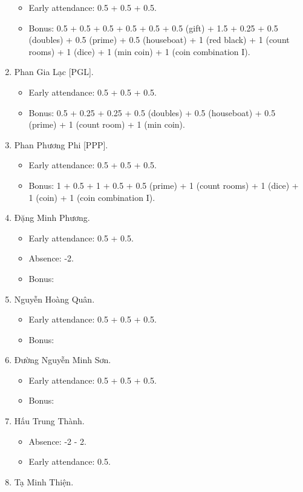 \documentclass{article}
\begin{document}
\begin{enumerate}
\begin{itemize}
		\item Early attendance: 0.5 + 0.5 + 0.5.
		\item Bonus: 0.5 + 0.5 + 0.5 + 0.5 + 0.5 + 0.5 (gift) + 1.5 + 0.25 + 0.5 (doubles) + 0.5 (prime) + 0.5 (houseboat) + 1 (red black) + 1 (count rooms) + 1 (dice) + 1 (min coin) + 1 (coin combination I).
	\end{itemize}
	\item {\sc Phan Gia Lạc [PGL].}
	\begin{itemize}
		\item Early attendance: 0.5 + 0.5 + 0.5.
		\item Bonus: 0.5 + 0.25 + 0.25 + 0.5 (doubles) + 0.5 (houseboat) + 0.5 (prime) + 1 (count room) + 1 (min coin).
	\end{itemize}
	\item {\sc Phan Phương Phi [PPP].}
	\begin{itemize}
		\item Early attendance: 0.5 + 0.5 + 0.5.
		\item Bonus: 1 + 0.5 + 1 + 0.5 + 0.5 (prime) + 1 (count rooms) + 1 (dice) + 1 (coin) + 1 (coin combination I).
	\end{itemize}
	\item {\sc Đặng Minh Phương.}
	\begin{itemize}
		\item Early attendance: 0.5 + 0.5.
		\item Absence: -2.
		\item Bonus: 
	\end{itemize}
	\item {\sc Nguyễn Hoàng Quân.}
	\begin{itemize}
		\item Early attendance: 0.5 + 0.5 + 0.5.
		\item Bonus: 
	\end{itemize}
	\item {\sc Đường Nguyễn Minh Sơn.}
	\begin{itemize}
		\item Early attendance: 0.5 + 0.5 + 0.5.
		\item Bonus: 
	\end{itemize}
	\item {\sc Hấu Trung Thành.}
	\begin{itemize}
		\item Absence: -2 - 2.
		\item Early attendance: 0.5.
	\end{itemize}
	\item {\sc Tạ Minh Thiện.}

\end{enumerate}
\end{document}
